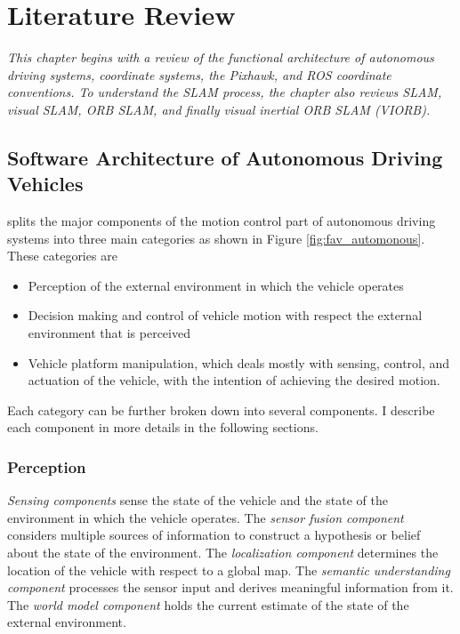 \setlength{\footskip}{8mm}

\chapter{Literature Review} 
\label{ch:literature-review}

\textit{This chapter begins with a review of the functional architecture of autonomous driving systems, coordinate systems, the Pixhawk, and ROS coordinate conventions. To understand the SLAM process, the chapter also reviews SLAM, visual SLAM, ORB SLAM, and finally visual inertial ORB SLAM (VIORB).} 

\section{Software Architecture of Autonomous Driving Vehicles}
\label{section-name-in-literature-review}

 splits the major components of the motion control part of autonomous driving systems into three main categories as shown in Figure \ref{fig:fav_automonous}. These categories are

\begin{itemize}
	\item Perception of the external environment in which the vehicle operates
	\item Decision making and control of vehicle motion with respect the external environment that is perceived
	\item Vehicle platform manipulation, which deals mostly with sensing, control, and actuation of the vehicle, with the intention of achieving the desired motion.
\end {itemize}

Each category can be further broken down into several components. I describe each component in more details in the following sections.

\subsection{Perception}

\textit{Sensing components} sense the state of the vehicle and the state of the environment in which the vehicle operates. The \textit{sensor fusion component} considers multiple sources of information to construct a hypothesis or belief about the state of the environment. The \textit{localization component} determines the location of the vehicle with respect to a global map. The \textit{semantic understanding component} processes the sensor input and derives meaningful information from it. The \textit{world model component} holds the current estimate of the state of the external environment.


